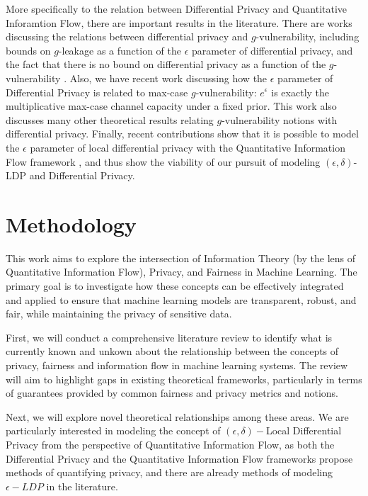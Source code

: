 \documentclass[12pt]{article}
\begin{document}
More specifically to the relation between Differential Privacy and Quantitative Inforamtion Flow, there are important results in the literature. There are works discussing the relations between differential privacy and $g$-vulnerability, including bounds on $g$-leakage as a function of the $\epsilon$ parameter of differential privacy, and the fact that there is no bound on differential privacy as a function of the $g$-vulnerability \cite{alvim2015information}. Also, we have recent work \cite{fernandes2022explaining} discussing how the $\epsilon$ parameter of Differential Privacy is related to max-case $g$-vulnerability: $e^\epsilon$ is exactly the multiplicative max-case channel capacity under a fixed prior. This work also discusses many other theoretical results relating $g$-vulnerability notions with differential privacy. Finally, recent contributions show that it is possible to model the $\epsilon$ parameter of local differential privacy with the Quantitative Information Flow framework \cite{fernandes2024explaining}, and thus show the viability of our pursuit of modeling $(\epsilon,\delta)$-LDP and Differential Privacy.

\section{Methodology}

This work aims to explore the intersection of Information Theory (by the lens of Quantitative Information Flow), Privacy, and Fairness in Machine Learning. The primary goal is to investigate how these concepts can be effectively integrated and applied to ensure that machine learning models are transparent, robust, and fair, while maintaining the privacy of sensitive data.

First, we will conduct a comprehensive literature review to identify what is currently known and unkown about the relationship between the concepts of privacy, fairness and information flow in machine learning systems. The review will aim to highlight gaps in existing theoretical frameworks, particularly in terms of guarantees provided by common fairness and privacy metrics and notions.

Next, we will explore novel theoretical relationships among these areas. We are particularly interested in modeling the concept of $(\epsilon,\delta)-$Local Differential Privacy from the perspective of Quantitative Information Flow, as both the Differential Privacy and the Quantitative Information Flow frameworks propose methods of quantifying privacy, and there are already methods of modeling $\epsilon-LDP$ in the literature\cite{fernandes2022explaining}. 
\end{document}
